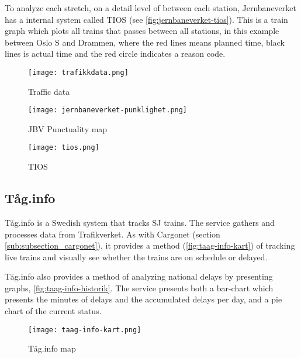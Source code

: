 To analyze each stretch, on a detail level of between each station,
Jernbaneverket has a internal system called TIOS (see \vref{fig:jernbaneverket-tios}).
This is a train graph which plots all trains that passes between all stations,
in this example between Oslo S and Drammen, where the red lines means planned
time, black lines is actual time and the red circle indicates a reason code. 

\begin{figure}[!htbp]
	\texttt{[image: trafikkdata.png]}
	\caption[Traffic data]{Traffic data	\cite{sintefPresis}}
	\label{fig:jernbaneverket-trafikkdata}
\end{figure}
\pagebreak

\begin{figure}[!htbp]
	\texttt{[image: jernbaneverket-punklighet.png]}
	\caption[JBV Punctuality map]{JBV Punctuality map \cite{jernbaneverketPunklighetKart}}
	\label{fig:jernbaneverket-punklighet}
\end{figure}
\pagebreak

\begin{figure}[!htbp]
	\texttt{[image: tios.png]}
	\caption[TIOS]{TIOS\cite{jernbaneverketPunklighetKart}}
	\label{fig:jernbaneverket-tios}
\end{figure}
\pagebreak


\clearpage
\subsection{Tåg.info}
\label{sub:subsection_taag.info}

Tåg.info\cite{taagInfo} is a Swedish system that tracks SJ\cite{svenskaJernban} trains. The
service gathers and processes data from Trafikverket\cite{trafikverket}. As
with Cargonet (section \vref{sub:subsection_cargonet}), it provides a method (\vref{fig:taag-info-kart}) of
tracking live trains and visually see whether the trains are on schedule or
delayed. 

Tåg.info also provides a method of analyzing national delays by presenting
graphs, \vref{fig:taag-info-historik}. The service presents both a bar-chart
which presents the minutes of delays and the accumulated delays per day, and a
pie chart of the current status.

\begin{figure}[!htbp]
	\texttt{[image: taag-info-kart.png]}
	\caption[Tåg.info map]{Tåg.info map
	\cite{taagInfo}}
	\label{fig:taag-info-kart}
\end{figure}
\pagebreak

